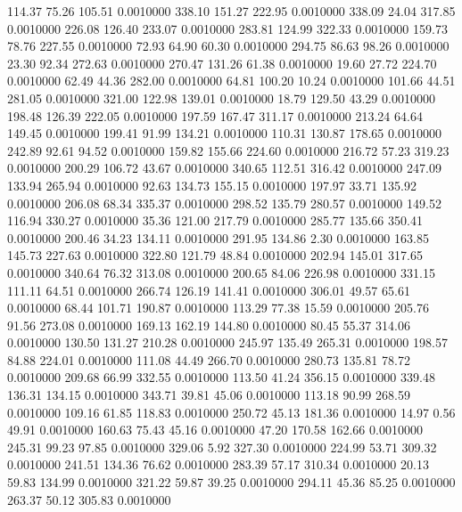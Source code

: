  114.37   75.26  105.51   0.0010000
 338.10  151.27  222.95   0.0010000
 338.09   24.04  317.85   0.0010000
 226.08  126.40  233.07   0.0010000
 283.81  124.99  322.33   0.0010000
 159.73   78.76  227.55   0.0010000
  72.93   64.90   60.30   0.0010000
 294.75   86.63   98.26   0.0010000
  23.30   92.34  272.63   0.0010000
 270.47  131.26   61.38   0.0010000
  19.60   27.72  224.70   0.0010000
  62.49   44.36  282.00   0.0010000
  64.81  100.20   10.24   0.0010000
 101.66   44.51  281.05   0.0010000
 321.00  122.98  139.01   0.0010000
  18.79  129.50   43.29   0.0010000
 198.48  126.39  222.05   0.0010000
 197.59  167.47  311.17   0.0010000
 213.24   64.64  149.45   0.0010000
 199.41   91.99  134.21   0.0010000
 110.31  130.87  178.65   0.0010000
 242.89   92.61   94.52   0.0010000
 159.82  155.66  224.60   0.0010000
 216.72   57.23  319.23   0.0010000
 200.29  106.72   43.67   0.0010000
 340.65  112.51  316.42   0.0010000
 247.09  133.94  265.94   0.0010000
  92.63  134.73  155.15   0.0010000
 197.97   33.71  135.92   0.0010000
 206.08   68.34  335.37   0.0010000
 298.52  135.79  280.57   0.0010000
 149.52  116.94  330.27   0.0010000
  35.36  121.00  217.79   0.0010000
 285.77  135.66  350.41   0.0010000
 200.46   34.23  134.11   0.0010000
 291.95  134.86    2.30   0.0010000
 163.85  145.73  227.63   0.0010000
 322.80  121.79   48.84   0.0010000
 202.94  145.01  317.65   0.0010000
 340.64   76.32  313.08   0.0010000
 200.65   84.06  226.98   0.0010000
 331.15  111.11   64.51   0.0010000
 266.74  126.19  141.41   0.0010000
 306.01   49.57   65.61   0.0010000
  68.44  101.71  190.87   0.0010000
 113.29   77.38   15.59   0.0010000
 205.76   91.56  273.08   0.0010000
 169.13  162.19  144.80   0.0010000
  80.45   55.37  314.06   0.0010000
 130.50  131.27  210.28   0.0010000
 245.97  135.49  265.31   0.0010000
 198.57   84.88  224.01   0.0010000
 111.08   44.49  266.70   0.0010000
 280.73  135.81   78.72   0.0010000
 209.68   66.99  332.55   0.0010000
 113.50   41.24  356.15   0.0010000
 339.48  136.31  134.15   0.0010000
 343.71   39.81   45.06   0.0010000
 113.18   90.99  268.59   0.0010000
 109.16   61.85  118.83   0.0010000
 250.72   45.13  181.36   0.0010000
  14.97    0.56   49.91   0.0010000
 160.63   75.43   45.16   0.0010000
  47.20  170.58  162.66   0.0010000
 245.31   99.23   97.85   0.0010000
 329.06    5.92  327.30   0.0010000
 224.99   53.71  309.32   0.0010000
 241.51  134.36   76.62   0.0010000
 283.39   57.17  310.34   0.0010000
  20.13   59.83  134.99   0.0010000
 321.22   59.87   39.25   0.0010000
 294.11   45.36   85.25   0.0010000
 263.37   50.12  305.83   0.0010000
